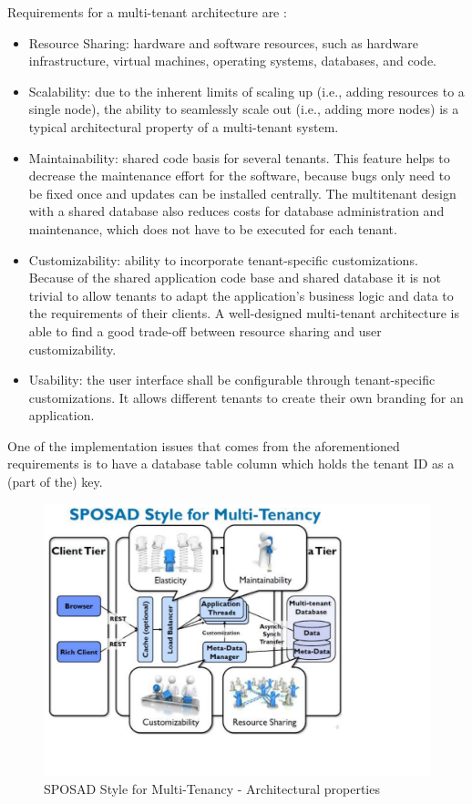 Requirements for a multi-tenant architecture are \cite{conf/se/Koziolek10}:
\begin{itemize}
	\item Resource Sharing: hardware and software resources, such
as hardware infrastructure, virtual machines, operating systems, databases, and code.
	\item Scalability: due to the inherent limits of scaling up (i.e., adding resources to a single node), the ability to seamlessly scale out (i.e., adding more nodes) is a typical architectural property of a multi-tenant system.
	\item Maintainability: shared code basis for several tenants. This feature helps to decrease the maintenance effort for the software,
because bugs only need to be fixed once and updates can be installed centrally. The multitenant design with a shared database also reduces costs for database administration and maintenance, which does not have to be executed for each tenant.
	\item Customizability: ability to incorporate tenant-specific customizations. Because of the shared application code base
and shared database it is not trivial to allow tenants to adapt the application's business logic and data to the requirements of their clients. A well-designed multi-tenant architecture is able to find a good trade-off between resource sharing and user customizability.
	\item Usability: the user interface shall be configurable through tenant-specific customizations. It allows different tenants to create their own branding for an application.
\end{itemize}

One of the implementation issues that comes from the aforementioned requirements is to have a database table column which holds the tenant ID as a (part of the) key.

\begin{figure}[h]
\centering
\includegraphics{patterns/Multi-tenantApplicationDiagram-02.pdf}
\caption{SPOSAD Style for Multi-Tenancy - Architectural properties}
\label{fig:Multi-tenantApplicationDiagram-02}
\end{figure}

